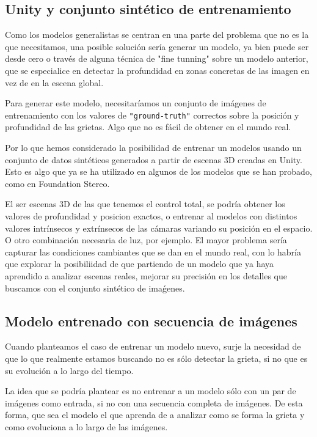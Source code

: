\subsection{Unity y conjunto sintético de entrenamiento}
Como los modelos generalistas se centran en una parte del problema que no es la que necesitamos, una posible solución sería generar un modelo, ya bien puede ser desde cero o través de alguna técnica de "fine tunning" sobre un modelo anterior, que se especialice en detectar la profundidad en zonas concretas de las imagen en vez de en la escena global.

Para generar este modelo, necesitaríamos un conjunto de imágenes de entrenamiento con los valores de \texttt{"ground-truth"} correctos sobre la posición y profundidad de las grietas. Algo que no es fácil de obtener en el mundo real.

Por lo que hemos considerado la posibilidad de entrenar un modelos usando un conjunto de datos sintéticos generados a partir de escenas 3D creadas en Unity. Esto es algo que ya se ha utilizado en algunos de los modelos que se han probado, como en Foundation Stereo.

El ser escenas 3D de las que tenemos el control total, se podría obtener los valores de profundidad y posicion exactos, o entrenar al modelos con distintos valores intrínsecos y extrínsecos de las cámaras variando su posición en el espacio. O otro combinación necesaria de luz, por ejemplo. El mayor problema sería capturar las condiciones cambiantes que se dan en el mundo real, con lo habría que explorar la posibiliidad de que partiendo de un modelo que ya haya aprendido a analizar escenas reales, mejorar su precisión en los detalles que buscamos con el conjunto sintético de imaǵenes.




\subsection{Modelo entrenado con secuencia de imágenes}
Cuando planteamos el caso de entrenar un modelo nuevo, surje la necesidad de que lo que realmente estamos buscando no es sólo detectar la grieta, si no que es su evolución a lo largo del tiempo.

La idea que se podría plantear es no entrenar a un modelo sólo con un par de imágenes como entrada, si no con una secuencia completa de imágenes. De esta forma, que sea el modelo el que aprenda de a analizar como se forma la grieta y como evoluciona a lo largo de las imágenes.

